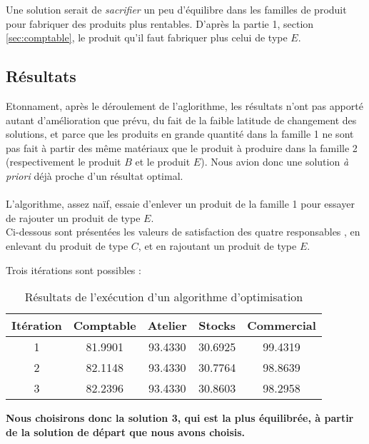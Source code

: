 Une solution serait de \emph{sacrifier} un peu d'équilibre dans les familles de
produit pour fabriquer des produits plus rentables. D'après la partie 1, section 
\ref{sec:comptable}, le produit qu'il faut fabriquer plus celui de type $E$.

\subsection{Résultats}
Etonnament, après le déroulement de l'aglorithme, les résultats n'ont pas apporté autant d'amélioration que prévu,
du fait de la faible latitude de changement des solutions, et parce que les produits en grande quantité dans la
famille 1 ne sont pas fait à partir des même matériaux que le produit à produire
dans la famille 2 (respectivement le produit $B$ et le produit $E$). Nous avion donc une solution \textsl{à priori} 
déjà proche d'un résultat optimal.\\
~\\
L'algorithme, assez naïf, essaie d'enlever un produit de la famille 1 pour
essayer de rajouter un produit de type $E$.\\
\newpage
Ci-dessous sont présentées les valeurs de satisfaction des quatre responsables ,
   en enlevant du produit de type $C$, et en rajoutant un produit de type $E$.

   Trois itérations sont possibles :
   \begin{table}[ht!]
   \begin{center}
\begin{tabular}{|c|c|c|c|c|}
\hline
    Itération & Comptable & Atelier & Stocks & Commercial \\
	\hline
1 &   81.9901 & 93.4330 & 30.6925 & 99.4319 \\
       \hline
2&   82.1148 & 93.4330 & 30.7764 & 98.8639 \\
       \hline
  3&  82.2396 & 93.4330 & 30.8603 & 98.2958 \\
       \hline

\end{tabular}
\end{center}
\caption{Résultats de l'exécution d'un algorithme d'optimisation}
\end{table}

\begin{center}
\textbf{Nous choisirons donc la solution 3, qui est la plus équilibrée, à partir de la
	solution de départ que nous avons choisis.}
\end{center}
